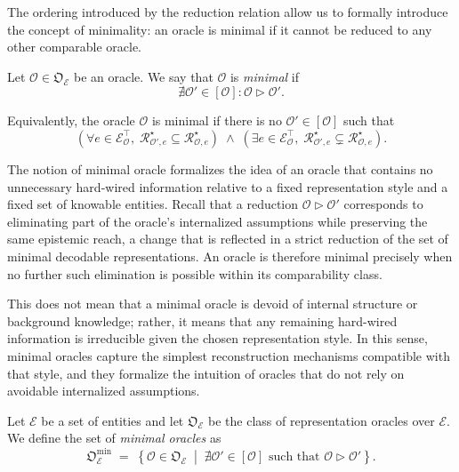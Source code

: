 The ordering introduced by the reduction relation allow us to formally introduce the concept of minimality: an oracle is minimal if it cannot be reduced to any other comparable oracle.

\begin{definition}
\label{def:minimal_oracle}
Let $\mathcal{O} \in \mathfrak{O}_{\mathcal{E}}$ be an oracle. We say that $\mathcal{O}$ is \emph{minimal} if
\[
\nexists \mathcal{O}' \in [\mathcal{O}] : \mathcal{O} \triangleright \mathcal{O}'.
\]
\end{definition}

\noindent
Equivalently, the oracle $\mathcal{O}$ is minimal if there is no $\mathcal{O}' \in [\mathcal{O}]$ such that
\[
\left(
\forall e \in \mathcal{E}^\top_{\mathcal{O}},\;
\mathcal{R}^\star_{\mathcal{O}', e} \subseteq \mathcal{R}^\star_{\mathcal{O}, e}
\right)
\;\wedge\;
\left(
\exists e \in \mathcal{E}^\top_{\mathcal{O}},\;
\mathcal{R}^\star_{\mathcal{O}', e} \subsetneq \mathcal{R}^\star_{\mathcal{O}, e}
\right).
\]

The notion of minimal oracle formalizes the idea of an oracle that contains no unnecessary hard-wired information relative to a fixed representation style and a fixed set of knowable entities. Recall that a reduction $\mathcal{O}\triangleright\mathcal{O}'$ corresponds to eliminating part of the oracle's internalized assumptions while preserving the same epistemic reach, a change that is reflected in a strict reduction of the set of minimal decodable representations. An oracle is therefore minimal precisely when no further such elimination is possible within its comparability class.

This does not mean that a minimal oracle is devoid of internal structure or background knowledge; rather, it means that any remaining hard-wired information is irreducible given the chosen representation style.
In this sense, minimal oracles capture the simplest reconstruction mechanisms compatible with that style, and they formalize the intuition of oracles that do not rely on avoidable internalized assumptions.

\begin{definition}
\label{def:class_minimal_oracles}
Let $\mathcal{E}$ be a set of entities and let $\mathfrak{O}_{\mathcal{E}}$ be the class of representation oracles over $\mathcal{E}$. We define the set of \emph{minimal oracles} as
\[
\mathfrak{O}_{\mathcal{E}}^{\min}
\;=\;
\left\{
\mathcal{O} \in \mathfrak{O}_{\mathcal{E}}
\;\middle|\;
\nexists \mathcal{O}' \in [\mathcal{O}] \text{ such that } \mathcal{O} \triangleright \mathcal{O}'
\right\}.
\]
\end{definition}

